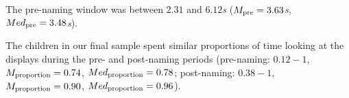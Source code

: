 \documentclass[
  doc,floatsintext]{apa6}
\begin{document}
The pre-naming window was between \(2.31\) and \(6.12\)\textit{s} (\(M_\textnormal{pre}=3.63\)\textit{s}, \(Med_\textnormal{pre}=3.48\)\textit{s}).

The children in our final sample spent similar proportions of time looking at the displays during the pre- and post-naming periods (pre-naming: \(0.12-1\), \(M_\textnormal{proportion}=0.74\), \(Med_\textnormal{proportion}=0.78\); post-naming: \(0.38-1\), \(M_\textnormal{proportion}=0.90\), \(Med_\textnormal{proportion}=0.96\)).
\end{document}
